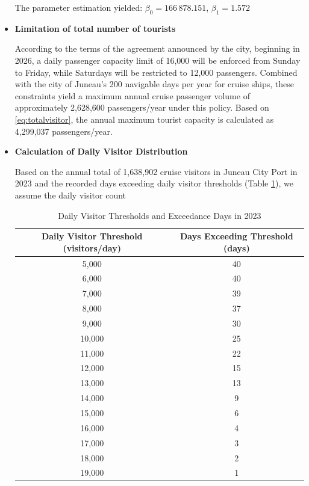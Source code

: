 \documentclass{mcmthesis}
\begin{document}
\begin{itemize}
The parameter estimation yielded:  
\(\beta_0 = 166\,878.151\), \(\beta_1 = 1.572\)
\item \textbf{Limitation of total number of tourists}\par
According to the terms of the agreement announced by the city, beginning in 2026, a daily passenger capacity limit of 16,000 will be enforced from Sunday to Friday, while Saturdays will be restricted to 12,000 passengers.  
Combined with the city of Juneau's 200 navigable days per year for cruise ships, these constraints yield a maximum annual cruise passenger volume of approximately 2,628,600 passengers/year under this policy. Based on \eqref{eq:totalvisitor}, the annual maximum tourist capacity is calculated as 4,299,037 passengers/year.
  \item \textbf{Calculation of Daily Visitor Distribution}\par
  Based on the annual total of 1,638,902 cruise visitors in Juneau City Port in 2023 and the recorded days exceeding daily visitor thresholds (Table \ref{tab:threshold}), we assume the daily visitor count
  \begin{table}[h!]
    \centering
    \begin{tabular}{cc}
      \toprule
      \rowcolor{gray!20} %
      \textbf{Daily Visitor Threshold (visitors/day)} & \textbf{Days Exceeding Threshold (days)} \\
      \midrule
      5,000  & 40 \\
      6,000  & 40 \\
      7,000  & 39 \\
      8,000  & 37 \\
      9,000  & 30 \\
      10,000 & 25 \\
      11,000 & 22 \\
      12,000 & 15 \\
      13,000 & 13 \\
      14,000 & 9  \\
      15,000 & 6  \\
      16,000 & 4  \\
      17,000 & 3  \\
      18,000 & 2  \\
      19,000 & 1  \\
      \bottomrule
    \end{tabular}
    \caption{Daily Visitor Thresholds and Exceedance Days in 2023}
    \label{tab:threshold} %
\end{table}


\end{itemize}
\end{document}
